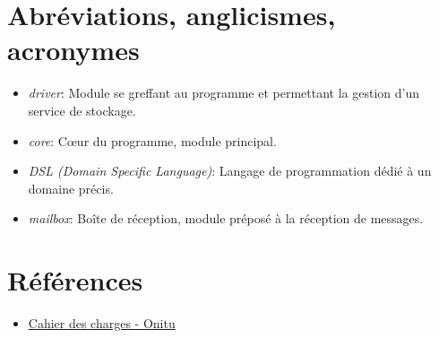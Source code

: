 \section{Abréviations, anglicismes, acronymes}

\begin{itemize}
\itemsep1pt\parskip0pt
\item
  \emph{driver}: Module se greffant au programme et permettant la
  gestion d'un service de stockage.
\item
  \emph{core}: Cœur du programme, module principal.
\item
  \emph{DSL (Domain Specific Language)}: Langage de programmation dédié
  à un domaine précis.
\item
  \emph{mailbox}: Boîte de réception, module préposé à la réception de messages.
\end{itemize}

\section{Références}
\begin{itemize}
\itemsep1pt\parskip0pt
\item
  \href{https://labeip.epitech.eu/svn/2015/onitu/rendu/2015_CDC2_FR_onitu.pdf}{Cahier des charges - Onitu}
\end{itemize}